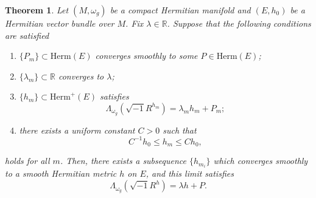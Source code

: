 \documentclass[12pt, reqno]{amsart}
\theoremstyle{plain}
\newtheorem{thm}{Theorem}[section]
\theoremstyle{definition}
\newcommand{\btheorem}{\begin{thm}}
\newcommand{\etheorem}{\end{thm}}
\newcommand{\sq}{\sqrt{-1}}
\newcommand{\beq}{\begin{equation}}
\newcommand{\eeq}{\end{equation}}
\newcommand{\bd}{\begin{enumerate}}
\newcommand{\ed}{\end{enumerate}}
\renewcommand{\>}{\rightarrow}
\newcommand{\R}{{\mathbb R}}
\renewcommand{\>}{\rightarrow}
\numberwithin{equation}{section} %
\begin{document}
\btheorem
\label{C^0toC^infty} Let $ (M,\omega_g) $ be a compact Hermitian manifold and $ (E, h_0)$ be a Hermitian vector bundle over $M$. Fix $\lambda\in \R$.  Suppose that the following conditions are satisfied  \bd \item
$\{ P_m \} \subset \mathrm{Herm}(E)$
converges smoothly to some $P \in \mathrm{Herm}(E)$;
\item $\{\lambda_m\}\subset \R$ converges to $\lambda$;
\item  $\{h_m\} \subset \mathrm{Herm}^+(E)$ satisfies
\beq \label{curvatureHm}
\Lambda_{\omega_g} \left(\sqrt{-1} R^{h_m}\right) = \lambda_m h_m + P_m;\eeq
\item  there exists a uniform constant $C>0$ such that
\begin{equation}\label{hm-bdd}
C^{-1} h_0 \leq h_m \leq C h_0,
\end{equation}
\ed  holds for all $m$.
Then, there exists a subsequence $\{h_{m_i}\}$ which converges smoothly to a smooth Hermitian metric $h$ on $E$, and this limit satisfies
\begin{equation}\label{curvatureHlimit}
\Lambda_{\omega_g}\left(\sq  R^{h} \right)= \lambda h + P.
\end{equation}
\etheorem
\end{document}
